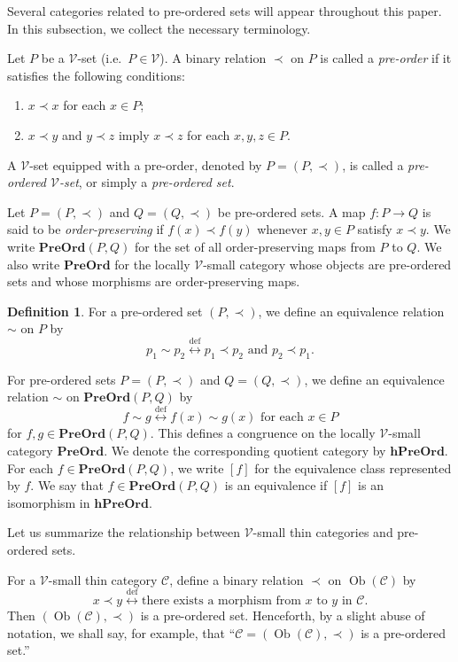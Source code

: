\documentclass[12pt, a4paper]{amsart}
\theoremstyle{definition}
\newtheorem{definition}[theorem]{Definition}
\newcommand{\defarrow}{\mathrel{\stackrel{\mathrm{def}}{\longleftrightarrow}}}
\newcommand{\Ob}{\mathop{\mathrm{Ob}}\nolimits}
\newcommand{\PreOrd}{\mathbf{PreOrd}}
\newcommand{\hPreOrd}{\mathbf{hPreOrd}}
\begin{document}
Several categories related to pre-ordered sets will appear throughout this
paper. In this subsection, we collect the necessary terminology.

Let $P$ be a $\mathcal{V}$-set (i.e.~$P \in \mathcal{V}$). A binary relation $\prec$ on $P$ is called a
\emph{pre-order} if it satisfies the following conditions:
\begin{enumerate}
    \item $x \prec x$ for each $x\in P$;
    \item $x \prec y$ and $y \prec z$ imply $x \prec z$ for each
    $x,y,z\in P$.
\end{enumerate}
A $\mathcal{V}$-set equipped with a pre-order, denoted by
$P=(P,\prec)$, is called a \emph{pre-ordered $\mathcal{V}$-set}, or simply a
\emph{pre-ordered set}.

Let $P=(P,\prec)$ and $Q=(Q,\prec)$ be pre-ordered sets.
A map $f:P\to Q$ is said to be \emph{order-preserving} if
$f(x)\prec f(y)$ whenever $x,y\in P$ satisfy $x\prec y$.
We write $\PreOrd(P,Q)$ for the set of all order-preserving maps from $P$
to $Q$.
We also write $\PreOrd$ for the locally $\mathcal{V}$-small category whose
objects are pre-ordered sets and whose morphisms are order-preserving maps.

\begin{definition}\label{definition:simonpre}
For a pre-ordered set $(P,\prec)$, we define an equivalence relation $\sim$
on $P$ by
\[
p_1\sim p_2
\defarrow
p_1\prec p_2 \text{ and } p_2\prec p_1.
\]
\end{definition}

For pre-ordered sets $P=(P,\prec)$ and $Q=(Q,\prec)$, we define an
equivalence relation $\sim$ on $\PreOrd(P,Q)$ by
\[
f\sim g
\defarrow
f(x)\sim g(x)\text{ for each }x\in P
\]
for $f,g\in\PreOrd(P,Q)$.    
This defines a congruence on the locally $\mathcal{V}$-small category
$\PreOrd$.
We denote the corresponding quotient category by $\hPreOrd$.
For each $f\in\PreOrd(P,Q)$, we write $[f]$ for the equivalence class
represented by $f$.
We say that $f \in \PreOrd(P,Q)$ is an equivalence if $[f]$ is an isomorphism in $\hPreOrd$.

Let us summarize the relationship between $\mathcal{V}$-small thin categories
and pre-ordered sets.

For a $\mathcal{V}$-small thin category $\mathcal{C}$, define a binary relation
$\prec$ on $\Ob(\mathcal{C})$ by
\[
x\prec y
\defarrow
\text{there exists a morphism from }x\text{ to }y\text{ in }\mathcal{C}.
\]
Then $(\Ob(\mathcal{C}),\prec)$ is a pre-ordered set. Henceforth, by a slight abuse of notation, we shall say, for example, that ``$\mathcal{C} = (\Ob(\mathcal{C}),\prec)$ is a pre-ordered set.''
\end{document}
